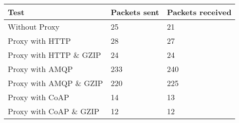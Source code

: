 \begin{tabular}{|l|l|l|}
\hline
\textbf{Test} & \textbf{Packets sent} & \textbf{Packets received} \\ \hline
Without Proxy                    &25         & 21        \\ \hline 
Proxy with HTTP                  &28         & 27        \\ \hline 
Proxy with HTTP \& GZIP          &24         & 24        \\ \hline 
Proxy with AMQP                  &233        & 240       \\ \hline 
Proxy with AMQP \& GZIP          &220        & 225       \\ \hline 
Proxy with CoAP                  &14         & 13        \\ \hline 
Proxy with CoAP \& GZIP          &12         & 12        \\ \hline 
\end{tabular}